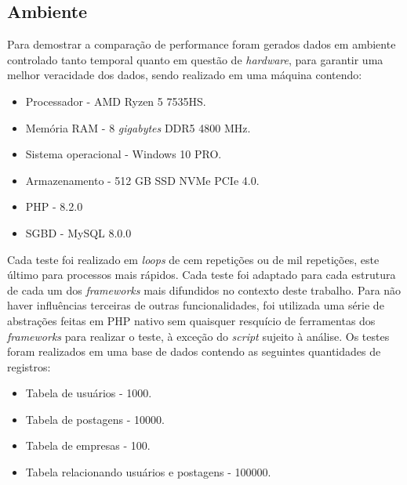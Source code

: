 \subsection{Ambiente}
Para demostrar a comparação de performance foram gerados dados em ambiente controlado tanto temporal quanto em questão de \textit{hardware}, para garantir uma melhor veracidade dos dados, sendo realizado em uma máquina contendo:

\begin{itemize}
    \item Processador - AMD Ryzen 5 7535HS.
    \item Memória RAM - 8 \textit{gigabytes} DDR5 4800 MHz.
    \item Sistema operacional - Windows 10 PRO.
    \item Armazenamento - 512 GB SSD NVMe PCIe 4.0.
    \item PHP - 8.2.0
    \item SGBD - MySQL 8.0.0
\end{itemize}

Cada teste foi realizado em \textit{loops} de cem repetições ou de mil repetições, este último para processos mais rápidos. Cada teste foi adaptado para cada estrutura de cada um dos \textit{frameworks} mais difundidos no contexto deste trabalho. Para não haver influências terceiras de outras funcionalidades, foi utilizada uma série de abstrações feitas em PHP nativo sem quaisquer resquício de ferramentas dos \textit{frameworks} para realizar o teste, à exceção do \textit{script} sujeito à análise. Os testes foram realizados em uma base de dados contendo as seguintes quantidades de registros:

\begin{itemize}
    \item Tabela de usuários - 1000.
    \item Tabela de postagens - 10000.
    \item Tabela de empresas - 100.
    \item Tabela relacionando usuários e postagens - 100000.
\end{itemize}